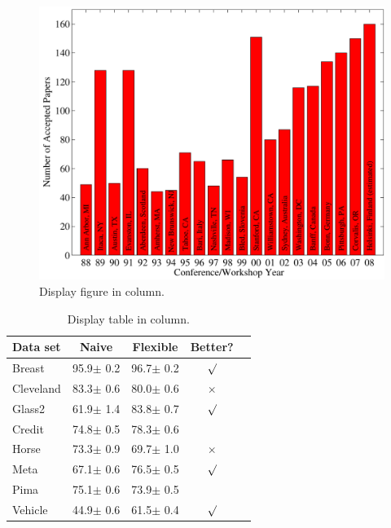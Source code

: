 \documentclass{article}
\begin{document}
\begin{figure}[ht]
\vskip 0.2in
\begin{center}
\centerline{\includegraphics[width=\columnwidth]{img/icml_numpapers}}
\caption{Display figure in column.}
\label{icml-historical}
\end{center}
\vskip -0.2in
\end{figure}

\lipsum[14]

\begin{table}[t]
\caption{Display table in column.}
\label{sample-table}
\vskip 0.15in
\begin{center}

\begin{tabular}{lcccr}
\toprule
Data set & Naive & Flexible & Better? \\
\midrule
Breast   & 95.9$\pm$ 0.2& 96.7$\pm$ 0.2& $\surd$ \\
Cleveland & 83.3$\pm$ 0.6& 80.0$\pm$ 0.6& $\times$\\
Glass2    & 61.9$\pm$ 1.4& 83.8$\pm$ 0.7& $\surd$ \\
Credit    & 74.8$\pm$ 0.5& 78.3$\pm$ 0.6&         \\
Horse     & 73.3$\pm$ 0.9& 69.7$\pm$ 1.0& $\times$\\
Meta      & 67.1$\pm$ 0.6& 76.5$\pm$ 0.5& $\surd$ \\
Pima      & 75.1$\pm$ 0.6& 73.9$\pm$ 0.5&         \\
Vehicle   & 44.9$\pm$ 0.6& 61.5$\pm$ 0.4& $\surd$ \\
\bottomrule
\end{tabular}
\end{center}
\vskip -0.1in
\end{table}
\end{document}
